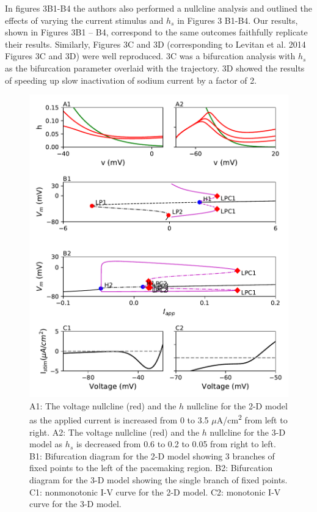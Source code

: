 In figures 3B1-B4 the authors also performed a nullcline analysis and outlined the effects of varying the current stimulus and $h_s$ in Figures 3 B1-B4. Our results, shown in Figures 3B1 – B4, correspond to the same outcomes faithfully replicate their results. Similarly, Figures 3C and 3D (corresponding to Levitan et al. 2014 Figures 3C and 3D) were well reproduced. 3C was a bifurcation analysis with $h_s$ as the bifurcation parameter overlaid with the trajectory. 3D showed the results of speeding up slow inactivation of sodium current by a factor of 2.\\ 


\begin{figure}
	\centering
	\includegraphics[scale=0.7]{../figures/figure_4.pdf}
	\caption{A1: The voltage nullcline (red) and the $h$ nullcline for the 2-D model as the applied current is increased from 0 to 3.5 $\mu$A/cm\textsuperscript{2} from left to right. A2: The voltage nullcline (red) and the $h$ nullcline for the 3-D model as $h_s$ is decreased from 0.6 to 0.2 to 0.05 from right to left. B1: Bifurcation diagram for the 2-D model showing 3 branches of fixed points to the left of the pacemaking region. B2: Bifurcation diagram for the 3-D model showing the single branch of fixed points. C1: nonmonotonic I-V curve for the 2-D model. C2: monotonic I-V curve for the 3-D model. }
	\label{fig:4}
\end{figure}

